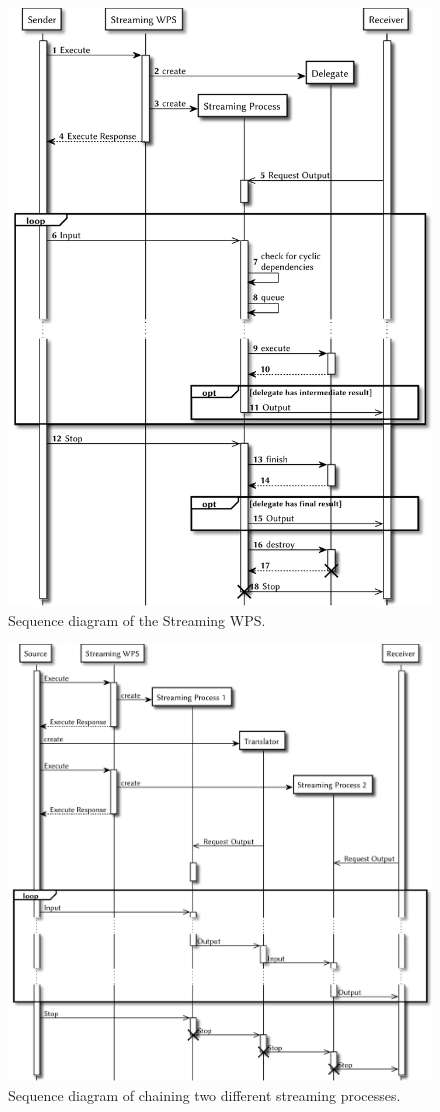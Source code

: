	\begin{figure}[!htb]
		\centering
		\includegraphics[width=.7868\textwidth]{figures/sequence-diagramm-swps.pdf} %
		\caption{\label{fig:sd:swps} Sequence diagram of the Streaming WPS.}
	\end{figure}
	\begin{figure}[!htb]
		\centering
		\includegraphics[width=\textwidth]{figures/sequence-diagramm-chain.pdf} %
		\caption{\label{fig:sd:chain} Sequence diagram of chaining two different streaming processes.}
	\end{figure}
